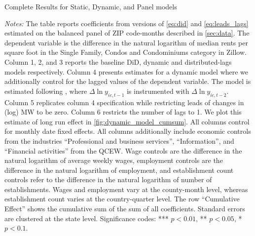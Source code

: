 \begin{table}[h!]\centering
	\caption{Complete Results for Static, Dynamic, and Panel models}
	\label{tab:horse_race_ab}
	\resizebox{.9\textwidth}{!}{
	
	}
	\begin{minipage}{0.95\textwidth} \footnotesize
		\vspace{3mm} 
		\textit{Notes:} The table reports coefficients from versions of \autoref{eq:did} and
		\autoref{eq:leads_lags} estimated on the balanced panel of ZIP code-months
		described in \autoref{sec:data}. The dependent variable is the difference in 
		the natural logarithm of median	rents per square foot in the Single Family, Condos 
		and Condominiums category in Zillow. Column 1, 2, and 3 reports the baseline
		DiD, dynamic and distributed-lags models respectively. Column 4 presents estimates
		for a dynamic model where we additionally control for the lagged values of the dependent 
		variable. The model is estimated following \textcite{ArellanoBond1991}, 
		where $\Delta \ln y_{ic, t-1}$ is instrumented with $\Delta \ln y_{ic, t-2}$. Column 5 
		replicates column 4 specification while restricting leads of changes in (log) MW to be zero.
		Column 6 restricts the number of lags to 1.  We plot this estimate of long run effect in \autoref{fig:dynamic_model_cumsum}.
		All columns control for monthly date fixed effects. All columns additionally  
		include economic controls from the industries ``Professional and business services'', 
		``Information'', and ``Financial activities'' from the QCEW. Wage controls are 
		the difference in the natural logarithm of average weekly wages, employment 
		controls are the difference in the natural logarithm of employment, and 
		establishment count controls refer to the difference in the natural logarithm 
		of number of establishments. Wages and employment vary at the county-month level,
		whereas establishment count varies at the country-quarter level. The row 
		``Cumulative Effect'' shows the cumulative 	sum of the sum of all coefficients. 
		Standard errors are clustered at the state level. Significance codes: *** $p < 0.01$, 
		** $p < 0.05$, * $p < 0.1$.
	\end{minipage}
\end{table}


